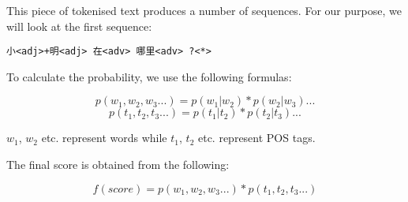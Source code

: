 \documentclass{article}
\begin{document}
This piece of tokenised text produces a number of sequences. For our purpose, we will look at the first sequence:

\begin{verbatim}
小<adj>+明<adj> 在<adv> 哪里<adv> ?<*>
\end{verbatim}

To calculate the probability, we use the following formulas:

\[p(w_1, w_2, w_3...) = p(w_1|w_2) * p(w_2|w_3)...\]
\[p(t_1, t_2, t_3...) = p(t_1|t_2) * p(t_2|t_3)...\]

$w_1$, $w_2$ etc. represent words while $t_1$, $t_2$ etc. represent POS tags.

The final score is obtained from the following:

\[f(score) = p(w_1, w_2, w_3...) * p(t_1, t_2, t_3...)\]
\end{document}
